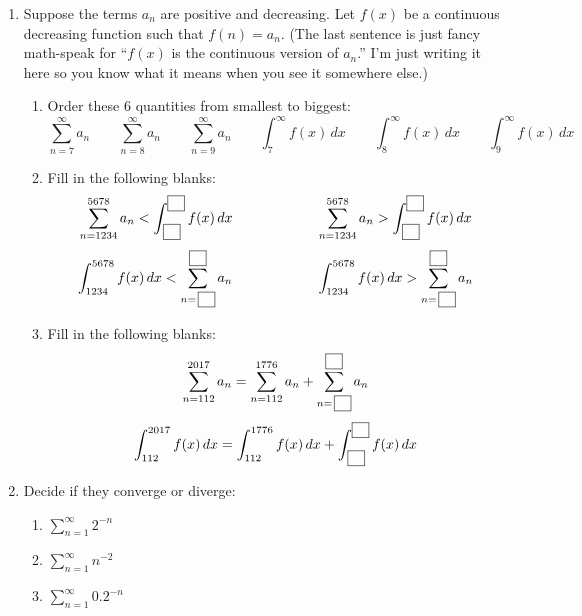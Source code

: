 \documentclass[11pt]{article}
\begin{document}
\begin{enumerate}

  \item Suppose the terms $a_n$ are positive and decreasing. Let $f(x)$ be a
  continuous decreasing function such that $f(n) = a_n$. (The last sentence is
  just fancy math-speak for ``$f(x)$ is the continuous version of $a_n$.'' I'm
  just writing it here so you know what it means when you see it somewhere
  else.) \begin{enumerate}

    \item Order these 6 quantities from smallest to biggest: \[
      \sum_{n=7}^\infty a_n
      \qquad
      \sum_{n=8}^\infty a_n
      \qquad
      \sum_{n=9}^\infty a_n
      \qquad
      \int_7^\infty f(x) \, dx
      \qquad
      \int_8^\infty f(x) \, dx
      \qquad
      \int_9^\infty f(x) \, dx
    \]

    \item Fill in the following blanks: \[
      \sum_{n=1234}^{5678} a_n <
      \int_{\,\fbox{\phantom{n}}}^{\fbox{\phantom{n}}} f(x) \, dx
      \qquad\qquad\qquad
      \sum_{n=1234}^{5678} a_n >
      \int_{\,\fbox{\phantom{n}}}^{\fbox{\phantom{n}}} f(x) \, dx
    \] \[
      \int_{1234}^{5678} f(x) \, dx <
      \sum_{n=\,\fbox{\phantom{n}}}^{\fbox{\phantom{n}}} a_n
      \qquad\qquad\qquad
      \int_{1234}^{5678} f(x) \, dx >
      \sum_{n=\,\fbox{\phantom{n}}}^{\fbox{\phantom{n}}} a_n
    \]

    \item Fill in the following blanks: \[
      \sum_{n=112}^{2017} a_n =
      \sum_{n=112}^{1776} a_n +
      \sum_{n=\,\fbox{\phantom{n}}}^{\fbox{\phantom{n}}} a_n
    \] \[
      \int_{112}^{2017} f(x) \, dx =
      \int_{112}^{1776} f(x) \, dx +
      \int_{\,\fbox{\phantom{n}}}^{\fbox{\phantom{n}}} f(x) \, dx
    \]

  \end{enumerate}

  \item Decide if they converge or diverge: \begin{enumerate}

    \item $\displaystyle \sum_{n=1}^\infty 2^{-n}$

    \item $\displaystyle \sum_{n=1}^\infty n^{-2}$

    \item $\displaystyle \sum_{n=1}^\infty 0.2^{-n}$


\end{enumerate}
\end{enumerate}
\end{document}
